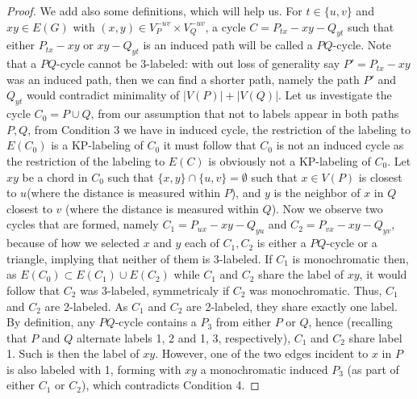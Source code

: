 \documentclass[12pt,a4paper,titlepage,openany]{report}
\begin{document}
\begin{proof}
We add also some definitions, which will help us. For $t \in \{u, v\}$ and $xy \in E(G)$ with $(x, y) \in V_P^{−uv} \times V_Q^{−uv}$, a cycle $C = P_{tx}-xy-Q_{yt}$ such that either $P_{tx}-xy$ or $xy-Q_{yt}$ is an induced path will be called a $PQ$-cycle. Note that a
$P Q$-cycle cannot be 3-labeled: with out loss of generality say $P' = P_{tx} -xy$ was an induced path, then we can find a shorter path, namely the path $P'$ and $Q_{yt}$ would contradict minimality of $|V(P)|+|V(Q)|$.\newline
Let us investigate the cycle $C_0=P\cup Q$, from our assumption that not to labels appear in both paths $P,Q$, from Condition 3 we have in induced cycle, the restriction of the labeling to $E(C_0)$ is a KP-labeling of $C_0$ it must follow that $C_0$ is not an induced cycle as the restriction of the labeling to $E(C)$ is obviously not a KP-labeling of $C_0$. Let $xy$ be a chord in $C_0$ such that $\{x, y\} \cap \{u, v\} = \emptyset$ such that $x \in V (P )$ is closest to $u$(where the distance is measured
within $P$), and $y$ is the neighbor of $x$ in $Q$ closest to $v$ (where the distance is measured within $Q$). Now we observe two cycles that are formed, namely $C_1 = P_{ux}-xy-Q_{yu}$ and $C_2 = P_{vx} -xy-Q_{yv}$, because of how we selected $x$ and $y$ each of $C_1,C_2$ is either a $P Q$-cycle or a triangle, implying that neither of them is 3-labeled. If $C_1$ is monochromatic then, as $E(C_0) \subset E(C_1 ) \cup E(C_2)$ while $C_1$ and $C_2$ share the label of $xy$, it would follow that $C_2$ was 3-labeled, symmetricaly if $C_2$ was monochromatic. Thus, $C_1$ and $C_2$ are 2-labeled. \newline
As $C_1$ and $C_2$ are 2-labeled, they share exactly one label. By definition, any $P Q$-cycle contains a $P_3$ from either $P$ or $Q$, hence (recalling that $P$ and $Q$ alternate labels 1, 2 and 1, 3, respectively), $C_1$ and $C_2$ share label 1. Such is then the label of $xy$. However, one of the two edges incident to $x$ in $P$ is also labeled with 1, forming with $xy$ a monochromatic
induced $P_3$ (as part of either $C_1$ or $C_2$), which contradicts Condition 4. 
\end{proof}
\end{document}
